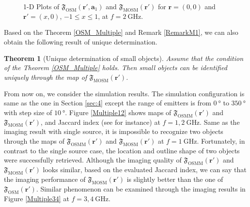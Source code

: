 \documentclass[3p,10pt]{elsarticle}
\newcommand{\ma}{\mathbf{a}}
\newcommand{\mr}{\mathbf{r}}
\DeclareMathOperator*{\osm}{OSM}
\DeclareMathOperator*{\osmm}{OSMM}
\DeclareMathOperator*{\mosm}{MOSM}
\theoremstyle{plain}
\newtheorem{theorem}{Theorem}[section]
\theoremstyle{remark}
\begin{document}
\begin{figure}[h]
\begin{center}
\caption{\label{FigureBessel3}1-D Plots of $\mathfrak{F}_{\osm}(\mr',\ma_1)$ and $\mathfrak{F}_{\mosm}(\mr')$ for $\mr=(0,0)$ and $\mr'=(x,0)$, $-1\leq x\leq 1$, at $f=\SI{2}{\giga\hertz}$.}
\end{center}
\end{figure}

Based on the Theorem \ref{OSM_Multiple} and Remark \ref{RemarkM1}, we can also obtain the following result of unique determination.

\begin{theorem}[Unique determination of small objects]\label{Theorem_Uniqueness}
Assume that the condition of the Theorem \ref{OSM_Multiple} holds. Then small objects can be identified uniquely through the map of $\mathfrak{F}_{\mosm}(\mr')$.
\end{theorem}

From now on, we consider the simulation results. The simulation configuration is same as the one in Section \ref{sec:4} except the range of emitters is from $\SI{0}{\degree}$ to $\SI{350}{\degree}$ with step size of $\SI{10}{\degree}$. Figure \ref{Multiple12} shows maps of $\mathfrak{F}_{\osmm}(\mr')$ and $\mathfrak{F}_{\mosm}(\mr')$, and Jaccard index (see \cite{Jaccard} for instance) at $f=1,\SI{2}{\giga\hertz}$. Same as the imaging result with single source, it is impossible to recognize two objects through the maps of $\mathfrak{F}_{\osmm}(\mr')$ and $\mathfrak{F}_{\mosm}(\mr')$ at $f=\SI{1}{\giga\hertz}$. Fortunately, in contrast to the single source case, the location and outline shape of two objects were successfully retrieved. Although the imaging quality of $\mathfrak{F}_{\osmm}(\mr')$ and $\mathfrak{F}_{\mosm}(\mr')$ looks similar, based on the evaluated Jaccard index, we can say that the imaging performance of $\mathfrak{F}_{\mosm}(\mr')$ is slightly better than the one of $\mathfrak{F}_{\osm}(\mr')$. Similar phenomenon can be examined through the imaging results in Figure \ref{Multiple34} at $f=3,\SI{4}{\giga\hertz}$.
\end{document}
